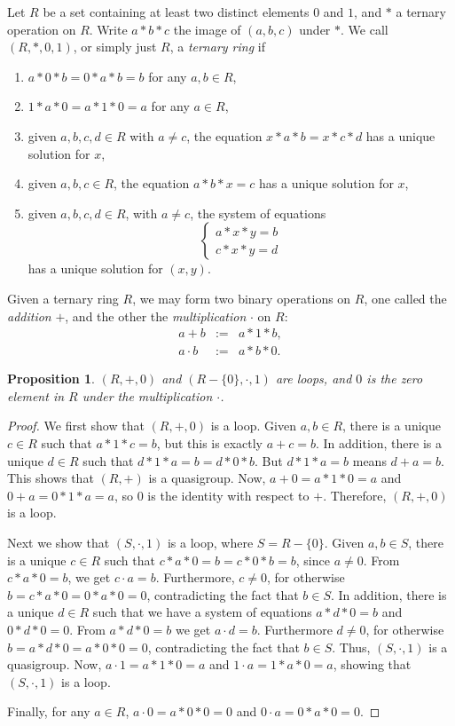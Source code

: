 \documentclass[12pt]{article}
\newtheorem{prop}{Proposition}
\begin{document}
Let $R$ be a set containing at least two distinct elements $0$ and $1$, and $*$ a ternary operation on $R$.  Write $a*b*c$ the image of $(a,b,c)$ under $*$.  We call $(R,*,0,1)$, or simply just $R$, a \emph{ternary ring} if
\begin{enumerate}
\item $a*0*b=0*a*b=b$ for any $a,b\in R$, 
\item $1*a*0=a*1*0=a$ for any $a\in R$,
\item given $a,b,c,d\in R$ with $a\ne c$, the equation $x*a*b=x*c*d$ has a unique solution for $x$,
\item given $a,b,c\in R$, the equation $a*b*x=c$ has a unique solution for $x$,
\item given $a,b,c,d\in R$, with $a\ne c$, the system of equations
\begin{displaymath}
\left\{
\begin{array}{ll}
a * x * y = b \\
c * x * y = d
\end{array}
\right.
\end{displaymath}
has a unique solution for $(x,y)$.
\end{enumerate}

Given a ternary ring $R$, we may form two binary operations on $R$, one called the \emph{addition} $+$, and the other the \emph{multiplication} $\cdot$ on $R$:
\begin{eqnarray*}
a+b &:=& a*1*b, \\
a\cdot b &:=& a*b*0.
\end{eqnarray*}

\begin{prop} $(R,+,0)$ and $(R-\lbrace 0\rbrace,\cdot,1)$ are loops, and $0$ is the zero element in $R$ under the multiplication $\cdot$.\end{prop}
\begin{proof}
We first show that $(R,+,0)$ is a loop.  Given $a,b\in R$, there is a unique $c\in R$ such that $a*1*c = b$, but this is exactly $a+c=b$.  In addition, there is a unique $d\in R$ such that $d*1*a = b = d*0*b$.  But $d*1*a=b$ means $d+a=b$.  This shows that $(R,+)$ is a quasigroup.  Now, $a+0=a*1*0=a$ and $0+a=0*1*a=a$, so $0$ is the identity with respect to $+$.  Therefore, $(R,+,0)$ is a loop.

Next we show that $(S,\cdot,1)$ is a loop, where $S=R-\lbrace 0\rbrace$.  Given $a,b\in S$, there is a unique $c\in R$ such that $c*a*0=b=c*0*b=b$, since $a\ne 0$.  From $c*a*0=b$, we get $c\cdot a=b$.  Furthermore, $c\ne 0$, for otherwise $b=c*a*0=0*a*0=0$, contradicting the fact that $b\in S$.  In addition, there is a unique $d\in R$ such that we have a system of equations $a*d*0=b$ and $0*d*0=0$.  From $a*d*0=b$ we get $a\cdot d=b$.  Furthermore $d\ne 0$, for otherwise $b=a*d*0=a*0*0=0$, contradicting the fact that $b\in S$.  Thus, $(S,\cdot,1)$ is a quasigroup.  Now, $a\cdot 1 = a*1*0=a$ and $1\cdot a=1*a*0=a$, showing that $(S,\cdot,1)$ is a loop.

Finally, for any $a\in R$, $a\cdot 0 = a*0*0=0$ and $0\cdot a= 0*a*0=0$.
\end{proof}
\end{document}
